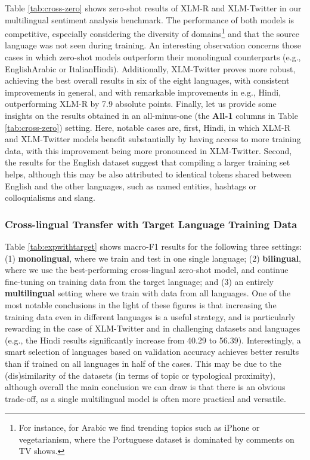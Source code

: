 \documentclass[10pt, a4paper]{article}
\begin{document}
Table \ref{tab:cross-zero} shows zero-shot results of XLM-R and XLM-Twitter in our multilingual sentiment analysis benchmark. The performance of both models is competitive, especially considering the diversity of domains\footnote{For instance, for Arabic we find trending topics such as iPhone or vegetarianism, where the Portuguese dataset is dominated by comments on TV shows.} and that the source language was not seen during training. An interesting observation concerns those cases in which zero-shot models outperform their monolingual counterparts (e.g., EnglishArabic or ItalianHindi). Additionally, XLM-Twitter proves more robust, achieving the best overall results in six of the eight languages, with consistent improvements in general, and with remarkable improvements in e.g., Hindi, outperforming XLM-R by 7.9 absolute points. Finally, let us provide some insights on the results obtained in an all-minus-one (the \textbf{All-1} columns in Table \ref{tab:cross-zero}) setting. Here, notable cases are, first, Hindi, in which XLM-R and XLM-Twitter models benefit substantially by having access to more training data, with this improvement being more pronounced in XLM-Twitter. Second, the results for the English dataset suggest that compiling a larger training set helps, although this may be also attributed to identical tokens shared between English and the other languages, such as named entities, hashtags or colloquialisms and slang.
 
 

 
 
\subsubsection{Cross-lingual Transfer with Target Language Training Data}
\label{sec:withtarget}

\vspace{1ex plus 0.5ex}

Table \ref{tab:expwithtarget} shows macro-F1 results for the following three settings: (1) \textbf{monolingual}, where we train and test in one single language; (2) \textbf{bilingual}, where we use the best-performing cross-lingual zero-shot model, and continue fine-tuning on training data from the target language; and (3) an entirely \textbf{multilingual} setting where we train with data from all languages. One of the most notable conclusions in the light of these figures is that increasing the training data even in different languages is a useful strategy, and is particularly rewarding in the case of XLM-Twitter and in challenging datasets and languages (e.g., the Hindi results significantly increase from 40.29 to 56.39). Interestingly, a smart selection of languages based on validation accuracy achieves better results than if trained on all languages in half of the cases. This may be due to the (dis)similarity of the datasets (in terms of topic or typological proximity), although overall the main conclusion we can draw is that there is an obvious trade-off, as a single multilingual model is often more practical and versatile. 
\end{document}
